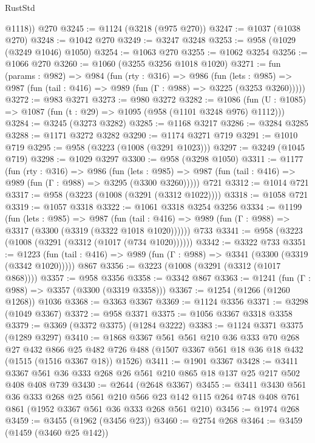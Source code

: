 \begin{lexlean}{RustStd}
\begin{coremodule}
        @1118))
    @270
@3245 := @1124 (@3218 (@975 @270))
@3247 := @1037 (@1038 @270)
@3248 := @1042 @270
@3249 := @3247 @3248
@3253 := @958 (@1029 (@3249 @1046) @1050)
@3254 := @1063 @270
@3255 := @1062 @3254
@3256 := @1066 @270
@3260 := @1060 (@3255 @3256 @1018 @1020)
@3271 := fun (params : @982) =>
  @984
    (fun (rty : @316) =>
    @986
      (fun (lets : @985) =>
      @987 (fun (tail : @416) => @989 (fun (Γ : @988) => @3225 (@3253 @3260)))))
@3272 := @983 @3271
@3273 := @980 @3272
@3282 := @1086 (fun (U : @1085) => @1087 (fun (t : @29) => @1095 (@958 (@1101 @3248 @976) @1112)))
@3284 := @3245 (@3273 @3282)
@3285 := @1168 @3217
@3286 := @3284 @3285
@3288 := @1171 @3272 @3282
@3290 := @1174 @3271 @719
@3291 := @1010 @719
@3295 := @958 (@3223 (@1008 (@3291 @1023)))
@3297 := @3249 (@1045 @719)
@3298 := @1029 @3297
@3300 := @958 (@3298 @1050)
@3311 := @1177
    (fun (rty : @316) =>
    @986
      (fun (lets : @985) =>
      @987 (fun (tail : @416) => @989 (fun (Γ : @988) => @3295 (@3300 @3260)))))
    @721
@3312 := @1014 @721
@3317 := @958 (@3223 (@1008 (@3291 (@3312 @1022))))
@3318 := @1058 @721
@3319 := @1057 @3318
@3322 := @1061 @3318 @3254 @3256
@3334 := @1199
    (fun (lets : @985) =>
    @987 (fun (tail : @416) => @989 (fun (Γ : @988) => @3317 (@3300 (@3319 (@3322 @1018 @1020))))))
    @733
@3341 := @958 (@3223 (@1008 (@3291 (@3312 (@1017 (@734 @1020))))))
@3342 := @3322 @733
@3351 := @1223
    (fun (tail : @416) => @989 (fun (Γ : @988) => @3341 (@3300 (@3319 (@3342 @1020)))))
    @867
@3356 := @3223 (@1008 (@3291 (@3312 (@1017 @868))))
@3357 := @958 @3356
@3358 := @3342 @867
@3363 := @1241 (fun (Γ : @988) => @3357 (@3300 (@3319 @3358)))
@3367 := @1254 (@1266 (@1260 @1268)) @1036
@3368 := @3363 @3367
@3369 := @1124 @3356
@3371 := @3298 (@1049 @3367)
@3372 := @958 @3371
@3375 := @1056 @3367 @3318 @3358
@3379 := @3369 (@3372 @3375) (@1284 @3222)
@3383 := @1124 @3371 @3375 (@1289 @3297)
@3410 := @1868
    @3367
    @561
    @561
    @210
    @36
    @333
    @70
    @268
    @27
    @432
    @866
    @25
    @482
    @726
    @488
    (@1507 @3367 @561 @18 @36 @18 @432 (@1515 (@1516 @3367 @18)) @1526)
@3411 := @1901 @3367
@3428 := @3411 @3367 @561 @36 @333 @268 @26 @561 @210 @865 @18 @137 @25 @217 @502 @408 @408 @739
@3430 := @2644 (@2648 @3367)
@3455 := @3411
    @3430
    @561
    @36
    @333
    @268
    @25
    @561
    @210
    @566
    @23
    @142
    @115
    @264
    @748
    @408
    @761
    @861
    (@1952 @3367 @561 @36 @333 @268 @561 @210)
@3456 := @1974 @268
@3459 := @3455 (@1962 (@3456 @23))
@3460 := @2754 @268
@3464 := @3459 (@1459 (@3460 @25 @142))

\end{coremodule}
\end{lexlean}
